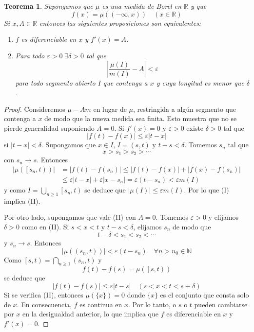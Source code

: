 \documentclass[12pt,a4paper]{article}
\theoremstyle{profesional}
\newtheorem{teorema}{Teorema}[section]
\theoremstyle{definicion-style}
\newcommand{\R}{\mathbb{R}}
\newcommand{\N}{\mathbb{N}}
\newcommand{\coint}[1]{\left[ #1 \right)}
\begin{document}
\begin{teorema}
    Supongamos que \( \mu \) es una medida de Borel en \( \R \) y que \[
        f(x) = \mu\left( (-\infty, x) \right) \quad (x \in \R)
    \]
    Si \( x, A \in \R \) entonces las siguientes proposiciones son equivalentes:\begin{enumerate}[label = (\roman*)]
        \item \( f \) es diferenciable en \( x \) y \( f'(x) = A \).
        \item Para todo \( \varepsilon > 0 \; \exists \delta > 0 \) tal que \[
                  \left| \dfrac{\mu(I)}{m(I)} - A \right| < \varepsilon
              \] para todo segmento abierto \( I \) que contenga a \( x \) y cuya longitud es menor que \( \delta \).
    \end{enumerate}
\end{teorema}
\begin{proof}
    Consideremos \( \mu - A m \) en lugar de \( \mu \), restringida a algún segmento que contenga a \( x \) de modo que la nueva medida sea finita.
    Esto muestra que no se pierde generalidad suponiendo \( A = 0 \). Si \( f'(x) = 0 \) y \( \varepsilon > 0 \) existe \( \delta > 0 \) tal que \[
        \left| f(t) - f(x) \right| \leq \varepsilon | t - x |
    \]
    si \( | t - x | < \delta \). Supongamos que \( x \in I \), \( I = (s, t) \) y \( t - s < \delta \). Tomemos \( s_n \) tal que \[
        x > s_1 > s_2 > \cdots
    \]
    con \( s_n \to s \). Entonces \begin{align*}
        | \mu(\coint{s_n, t}) | & = | f(t) - f(s_n) | \leq |f(t) - f(x)| + |f(x) - f(s_n)|                                    \\
                                & \leq \varepsilon |t - x| + \varepsilon |x - s_n| = \varepsilon (t - s_n) < \varepsilon m(I)
    \end{align*}
    y como \( I = \bigcup_{n \geq 1} \coint{s_n, t} \) se deduce que \( |\mu(I)| \leq \varepsilon m(I) \). Por lo que (I) implica (II).

    Por otro lado, supongamos que vale (II) con \( A = 0 \). Tomemos \( \varepsilon > 0 \) y elijamos \( \delta > 0 \) como en (II).
    Si \( s < x < t \) y \( t - s < \delta \), elijamos \( s_n \) de modo que \[
        t-\delta < s_1 < s_2 < \cdots
    \]
    y \( s_n \to s \). Entonces \[
        |\mu((s_n, t))| < \varepsilon (t - s_n) \quad \forall n > n_0 \in \N
    \]
    Como \( \coint{s, t} = \bigcap_{n \geq 1} (s_n, t) \) y \[
        f(t) - f(s) = \mu\left( \coint{s, t} \right)
    \]
    se deduce que \[
        \left | f(t) - f(s) \right| \leq \varepsilon |t - s| \quad (s < x < t < s + \delta)
    \]
    Si se verifica (II), entonces \( \mu(\{ x \}) = 0 \) donde \( \{ x \} \) es el conjunto que consta solo de \( x \). En consecuencia, \( f \) es continua en \( x \).
    Por lo tanto, o \( s \) o \( t \) pueden cambiarse por \( x \) en la desigualdad anterior, lo que implica que \( f \) es diferenciable en \( x \) y \( f'(x) = 0 \).
\end{proof}
\end{document}
